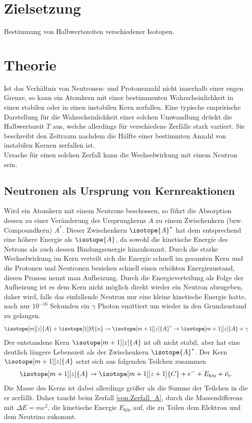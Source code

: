\newpage
\section*{Zielsetzung}
Bestimmung von Halbwertszeiten verschiedener Isotopen.
\section{Theorie}
Ist das Verhältnis von Neutronen- und Protonenzahl nicht innerhalb einer engen Grenze, so kann ein Atomkern mit einer bestimmenten Wahrscheinlichkeit in einen stabilen oder in einen instabilen Kern zerfallen. 
Eine typische emprirische Darstellung für die Wahrscheinlichkeit einer solchen Umwandlung drückt die Halbwertszeit $T$ aus, welche allerdings für verschiedene Zerfälle stark variiert.
Sie beschreibt den Zeitraum nachdem die Hälfte einer bestimmten Anzahl von instabilen Kernen zerfallen ist.\\
Ursache für einen solchen Zerfall kann die Wechselwirkung mit einem Neutron sein.
\subsection{Neutronen als Ursprung von Kernreaktionen}
Wird ein Atomkern mit einem Neutrone beschossen, so führt die Absorption dessen zu einer Veränderung des Ursprungkerns $A$ zu einem Zwischenkern (bzw. Compoundkern) $A^*$.
Dieser Zwischenkern $\isotope{A}^*$ hat dem entsprechend eine höhere Energie als $\isotope{A}$, da sowohl die kinetische Energie des Netrons als auch dessen Bindungsenergie hinzukommt.
Durch die starke Wechselwirkung im Kern verteilt sich die Energie schnell im gesamten Kern und die Protonen und Neutronen beziehen schnell einen erhöhten Energiezustand, diesen Prozess nennt man Aufheizung.
Durch die Energieverteilung als Folge der Aufheizung ist es dem Kern nicht möglich direkt wieder ein Neutron abzugeben, daher wird, falls das einfallende Neutron nur eine kleine kinetische Energie hatte, nach nur $10^{-16}$ Sekunden ein $\gamma$ Photon emittiert um wieder in den Grundzustand zu gelangen.
\begin{equation}
    \isotope[m][z]{A} + \isotope[1][0]{n} \to \isotope[m+1][z]{A}^{*} \to \isotope[m+1][z]{A} + \gamma \nonumber
\end{equation}
Der entstandene Kern $\isotope[m+1][z]{A}$ ist oft nicht stabil, aber hat eine deutlich längere Lebenszeit als der Zwischenkern $\isotope{A}^*$.
Der Kern $\isotope[m+1][z]{A}$ setzt sich aus folgenden Teilchen zusammen
\begin{equation}
    \isotope[m+1][z]{A} \to \isotope[m+1][z+1]{C} + e^- + E_{\text{kin}} + \bar{\nu_{\text{e}}} \label{eqn:Zerfall_A}.
\end{equation}
Die Masse des Kerns ist dabei allerdings größer als die Summe der Teilchen in die er zerfällt.
Daher taucht beim Zerfall \ref{eqn:Zerfall_A}, durch die Massendifferenz mit $\Delta E = mc^2$, die kinetische Energie $E_{\text{kin}}$ auf, die zu Teilen dem Elektron und dem Neutrino zukommt.

